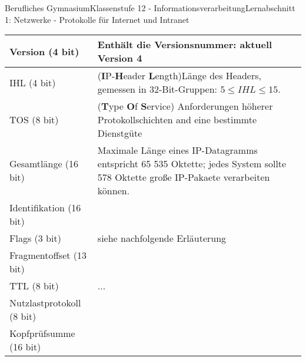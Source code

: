\documentclass[11pt,oneside,openany,headings=optiontotoc,11pt,numbers=noenddot]{article}
\begin{document}
\begin{worksheet}{Berufliches Gymnasium}{Klassenstufe 12 - Informationsverarbeitung}{Lernabschnitt 1: Netzwerke - Protokolle für Internet und Intranet}
\begin{tabularx}{\textwidth}{|l|X|}
			\hline
			Version (4 bit) & Enthält die Versionsnummer: aktuell Version 4\\
			\hline
			IHL (4 bit) & (\textbf{I}P-\textbf{H}eader \textbf{L}ength)Länge des Headers, gemessen in 32-Bit-Gruppen: \(5 \leq IHL \leq 15\).\\
			\hline
			TOS (8 bit) & (\textbf{T}ype \textbf{O}f \textbf{S}ervice) Anforderungen höherer Protokollschichten and eine bestimmte Dienstgüte\\
			\hline
			Gesamtlänge (16 bit) & Maximale Länge eines IP-Datagramms entspricht 65 535 Oktette; jedes System sollte 578 Oktette große IP-Pakaete verarbeiten können.\\
			\hline
			Identifikation (16 bit) & \multirow{3}{*}{siehe nachfolgende Erläuterung}\\
			\cline{1-1}
			Flags (3 bit) & \\
			\cline{1-1}
			Fragmentoffset (13 bit) & \\
			\hline
			TTL (8 bit) & ...\\
			\hline
			Nutzlastprotokoll (8 bit) & \\
			\hline
			Kopfprüfsumme (16 bit) & \\
			\hline
		\end{tabularx}
	\end{worksheet}
\end{document}
